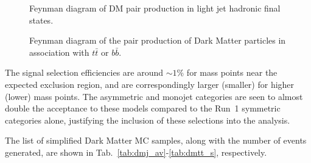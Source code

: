 \begin{figure}[h!] \centering
  \caption{Feynman diagram of DM pair production in light jet hadronic final states. \cite{Abercrombie:2015wmb}}
  \label{fig:DMfeynman} 
\end{figure}

\begin{figure}[h!] \centering
  \caption{Feynman diagram of the pair production of Dark Matter particles in
  association with $t\bar{t}$ or $b\bar{b}$. \cite{Abercrombie:2015wmb}}
  \label{fig:feynman_hf}
\end{figure}

The signal selection efficiencies are around $\sim 1$\% for mass points near the expected exclusion
region, and are correspondingly larger (smaller) for higher (lower) mass points.
The asymmetric and monojet categories are seen to almost double the acceptance
to these models compared to the Run~1 symmetric categories alone, justifying the
inclusion of these selections into the analysis.

The list of simplified Dark Matter MC samples, along with the number of events 
generated, are shown in Tab.~\ref{tab:dmj_av}-\ref{tab:dmtt_s}, respectively.

